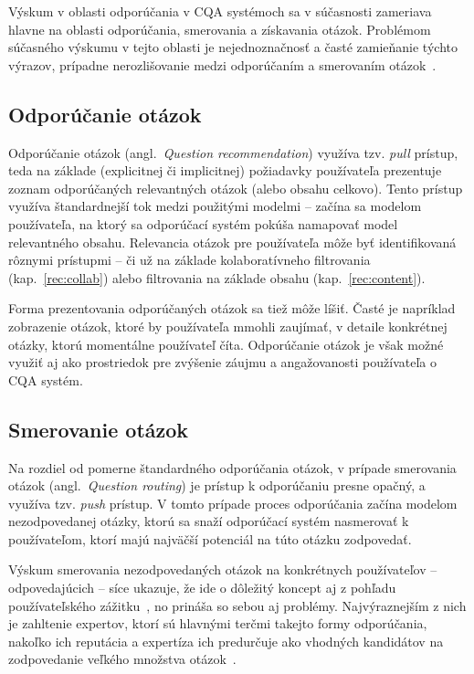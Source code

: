 Výskum v oblasti odporúčania v CQA systémoch sa v súčasnosti zameriava hlavne na oblasti odporúčania, smerovania
a získavania otázok. Problémom súčasného výskumu v tejto oblasti je nejednoznačnosť a časté zamieňanie týchto výrazov,
prípadne nerozlišovanie medzi odporúčaním a smerovaním otázok~\cite{Srba2016}.

\subsection{Odporúčanie otázok}\label{q:rec}

Odporúčanie otázok (angl.~\emph{Question recommendation}) využíva tzv. \emph{pull} prístup, teda na základe (explicitnej
či implicitnej) požiadavky používateľa prezentuje zoznam odporúčaných relevantných otázok (alebo obsahu celkovo).
Tento prístup využíva štandardnejší tok medzi použitými modelmi -- začína sa modelom používateľa, na ktorý sa odporúčací
systém pokúša namapovať model relevantného obsahu.
Relevancia otázok pre používateľa môže byť identifikovaná rôznymi prístupmi -- či už na základe kolaboratívneho
filtrovania (kap.~\ref{rec:collab}) alebo filtrovania na základe obsahu (kap.~\ref{rec:content}).

Forma prezentovania odporúčaných otázok sa tiež môže líšiť. Časté je napríklad zobrazenie otázok, ktoré by používateľa
mmohli zaujímať, v detaile konkrétnej otázky, ktorú momentálne používateľ číta. Odporúčanie otázok je však možné využiť
aj ako prostriedok pre zvýšenie záujmu a angažovanosti používateľa o CQA systém.


\subsection{Smerovanie otázok}\label{q:routing}

Na rozdiel od pomerne štandardného odporúčania otázok, v prípade smerovania otázok (angl.~\emph{Question routing})
je prístup k odporúčaniu presne opačný, a využíva tzv. \emph{push} prístup. V tomto prípade proces odporúčania začína
modelom nezodpovedanej otázky, ktorú sa snaží odporúčací systém nasmerovať k používateľom, ktorí majú najväčší potenciál
na túto otázku zodpovedať.

Výskum smerovania nezodpovedaných otázok na konkrétnych používateľov -- odpovedajúcich -- síce ukazuje, že ide o dôležitý
koncept aj z pohľadu používateľského zážitku~\cite{Li2010,Li2011}, no prináša so sebou aj problémy. Najvýraznejším z nich je zahltenie
expertov, ktorí sú hlavnými terčmi takejto formy odporúčania, nakoľko ich reputácia a expertíza ich predurčuje ako vhodných
kandidátov na zodpovedanie veľkého množstva otázok~\cite{Pal2015}.


